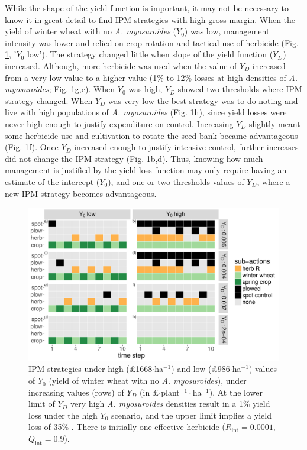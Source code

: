 \documentclass[9pt,twocolumn,twoside,lineno]{pnas-new}
\begin{document}
While the shape of the yield function is important, it may not be necessary to know it in great detail to find IPM strategies with high gross margin. When the yield of winter wheat with no \textit{A. myosuroides} ($Y_0$) was low, management intensity was lower and relied on crop rotation and tactical use of herbicide (Fig. \ref{fig:Y0_YD}, '$Y_0$ low'). The strategy changed little when slope of the yield function ($Y_D$) increased. Although, more herbicide was used when the value of $Y_D$ increased from a very low value to a higher value (1\% to 12\% losses at high densities of \textit{A. myosuroides}; Fig. \ref{fig:Y0_YD}g,e). When $Y_0$ was high, $Y_D$ showed two thresholds where IPM strategy changed. When $Y_D$ was very low the best strategy was to do noting and live with high populations of \textit{A. myosuroides} (Fig. \ref{fig:Y0_YD}h), since yield losses were never high enough to justify expenditure on control. Increasing $Y_D$ slightly meant some herbicide use and cultivation to rotate the seed bank became advantageous (Fig. \ref{fig:Y0_YD}f). Once $Y_D$ increased enough to justify intensive control, further increases did not change the IPM strategy (Fig. \ref{fig:Y0_YD}b,d). Thus, knowing how much management is justified by the yield loss function may only require having an estimate of the intercept ($Y_0$), and one or two thresholds values of $Y_D$, where a new IPM strategy becomes advantageous.
\begin{figure}
	\centering
	\includegraphics[width=1\linewidth]{MS_act_seq_YD_Y0.pdf}
	\caption{IPM strategies under high (\pounds 1668$\cdot$ha$^{-1}$) and low (\pounds 986$\cdot$ha$^{-1}$) values of $Y_0$ (yield of winter wheat with no \textit{A. myosuroides}), under increasing values (rows) of $Y_D$ (in \pounds$\cdot$plant$^{-1}\cdot$ha$^{-1}$). At the lower limit of $Y_D$ very high \textit{A. myosuroides} densities result in a 1\% yield loss under the high $Y_0$ scenario, and the upper limit implies a yield loss of 35\% . There is initially one effective herbicide ($R_\text{int} = 0.0001$, $Q_\text{int} = 0.9$).}
	\label{fig:Y0_YD} 
\end{figure}
\end{document}
